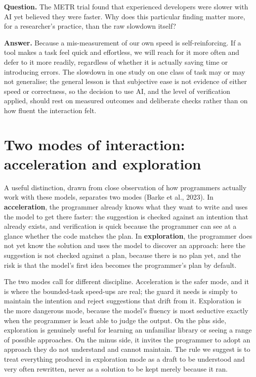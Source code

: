 \documentclass[
  letterpaper,
  11pt]{scrbook}
\begin{document}
\begin{tcolorbox}[enhanced jigsaw, arc=.35mm, bottomrule=.15mm, bottomtitle=1mm, breakable, colback=white, colbacktitle=quarto-callout-note-color!10!white, colframe=quarto-callout-note-color-frame, coltitle=black, left=2mm, leftrule=.75mm, opacityback=0, opacitybacktitle=0.6, rightrule=.15mm, title={Check your understanding: the perception gap}, titlerule=0mm, toprule=.15mm, toptitle=1mm]

\textbf{Question.} The METR trial found that experienced developers were
slower with AI yet believed they were faster. Why does this particular
finding matter more, for a researcher's practice, than the raw slowdown
itself?

\textbf{Answer.} Because a mis-measurement of our own speed is
self-reinforcing. If a tool makes a task feel quick and effortless, we
will reach for it more often and defer to it more readily, regardless of
whether it is actually saving time or introducing errors. The slowdown
in one study on one class of task may or may not generalise; the general
lesson is that subjective ease is not evidence of either speed or
correctness, so the decision to use AI, and the level of verification
applied, should rest on measured outcomes and deliberate checks rather
than on how fluent the interaction felt.

\end{tcolorbox}

\section{Two modes of interaction: acceleration and
exploration}\label{two-modes-of-interaction-acceleration-and-exploration}

A useful distinction, drawn from close observation of how programmers
actually work with these models, separates two modes (Barke et al.,
2023). In \textbf{acceleration}, the programmer already knows what they
want to write and uses the model to get there faster: the suggestion is
checked against an intention that already exists, and verification is
quick because the programmer can see at a glance whether the code
matches the plan. In \textbf{exploration}, the programmer does not yet
know the solution and uses the model to discover an approach: here the
suggestion is not checked against a plan, because there is no plan yet,
and the risk is that the model's first idea becomes the programmer's
plan by default.

The two modes call for different discipline. Acceleration is the safer
mode, and it is where the bounded-task speed-ups are real; the guard it
needs is simply to maintain the intention and reject suggestions that
drift from it. Exploration is the more dangerous mode, because the
model's fluency is most seductive exactly when the programmer is least
able to judge the output. On the plus side, exploration is genuinely
useful for learning an unfamiliar library or seeing a range of possible
approaches. On the minus side, it invites the programmer to adopt an
approach they do not understand and cannot maintain. The rule we suggest
is to treat everything produced in exploration mode as a draft to be
understood and very often rewritten, never as a solution to be kept
merely because it ran.
\end{document}
